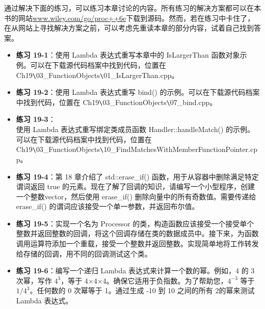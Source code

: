 通过解决下面的练习，可以练习本章讨论的内容。所有练习的解决方案都可以在本书的网站\url{www.wiley.com/go/proc++6e}下载到源码。然而，若在练习中卡住了，在从网站上寻找解决方案之前，可以考虑先重读本章的部分内容，试着自己找到答案。

\begin{itemize}
\item
\textbf{练习 19-1}：使用 Lambda 表达式重写本章中的 IsLargerThan 函数对象示例。可以在下载源代码档案中找到代码，位置在 Ch19\verb|\|03\_FunctionObjects\verb|\|01\_IsLargerThan.cpp。

\item
\textbf{练习 19-2}：使用 Lambda 表达式重写 bind() 的示例。可以在下载源代码档案中找到代码，位置在 Ch19\verb|\|03\_FunctionObjects\verb|\|07\_bind.cpp。

\item
\textbf{练习 19-3}：\\使用 Lambda 表达式重写绑定类成员函数 Handler::handleMatch() 的示例。可以在下载源代码档案中找到代码，位置在 Ch19\verb|\|03\_FunctionObjects\verb|\|10\_FindMatchesWithMemberFunctionPointer.cpp。

\item
\textbf{练习 19-4}：第 18 章介绍了 std::erase\_if() 函数，用于从容器中删除满足特定谓词返回 true 的元素。现在了解了回调的知识，请编写一个小型程序，创建一个整数vector，然后使用 erase\_if() 删除向量中的所有奇数值。需要传递给 erase\_if() 的谓词应该接受一个单一参数，并返回布尔值。

\item
\textbf{练习 19-5}：实现一个名为 Processor 的类，构造函数应该接受一个接受单个整数并返回整数的回调，将这个回调存储在类的数据成员中。接下来，为函数调用运算符添加一个重载，接受一个整数并返回整数。实现简单地将工作转发给存储的回调，用不同的回调测试这个类。

\item
\textbf{练习 19-6}：编写一个递归 Lambda 表达式来计算一个数的幂。例如，4 的 3 次幂，写作 $4^3$，等于 4×4×4。确保它适用于负指数。为了帮助您，$4^{-3}$ 等于 $1/4^3$。任何数的 0 次幂等于 1。通过生成 -10 到 10 之间的所有 2的幂来测试 Lambda 表达式。
\end{itemize}
